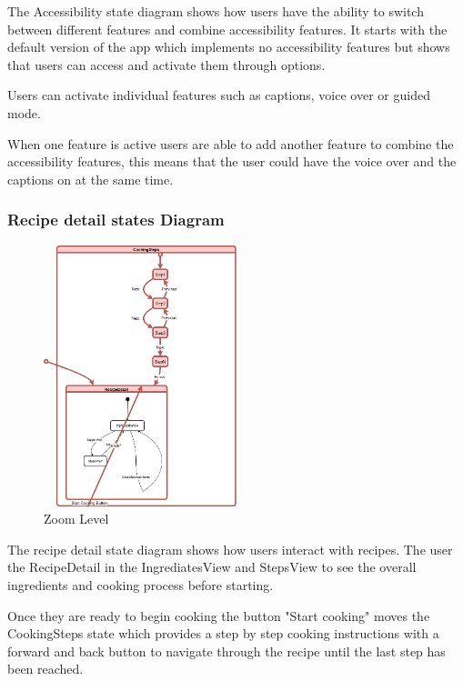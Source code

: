 \documentclass[]{project_final}
\begin{document}
The Accessibility state diagram shows how users have the ability to switch between different features and combine accessibility features. It starts with the default version of the app which implements no accessibility features but shows that users can access and activate them through options.

Users can activate individual features such as captions, voice over or guided mode.

When one feature is active users are able to add another feature to combine the accessibility features, this means that the user could have the voice over and the captions on at the same time.


\newpage

\subsubsection{Recipe detail states Diagram}
\begin{figure}[ht!]
    \centering
    \includegraphics[width=0.5\textwidth]{RecipeDetailStateMRA.png}
    \vspace*{0.0cm}
    \caption{Zoom Level}
    \label{fig:1}
\end{figure}

The recipe detail state diagram shows how users interact with recipes.
The user the RecipeDetail in the IngrediatesView and StepsView to see the overall ingredients and cooking process before starting.

Once they are ready to begin cooking the button "Start cooking" moves the CookingSteps state which provides a step by step cooking instructions with a forward and back button to navigate through the recipe until the last step has been reached.
\end{document}
